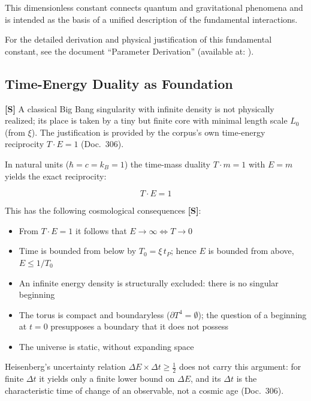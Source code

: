 This dimensionless constant connects quantum and gravitational phenomena and is intended as the basis of a unified description of the fundamental interactions.

\begin{tcolorbox}[colback=yellow!10!white,colframe=yellow!50!black,title=Note on Derivation]
	For the detailed derivation and physical justification of this fundamental constant, see the document ``Parameter Derivation'' (available at: ).
\end{tcolorbox}
	
	\subsection{Time-Energy Duality as Foundation}
	
	\begin{revolutionary}[Thesis]
		\textbf{[S]} A classical Big Bang singularity with infinite density is not physically realized; its place is taken by a tiny but finite core with minimal length scale $L_0$ (from $\xi$). The justification is provided by the corpus's own time-energy reciprocity $T\cdot E = 1$ (Doc.~306).
	\end{revolutionary}
	
	In natural units ($\hbar = c = k_B = 1$) the time-mass duality $T \cdot m = 1$ with $E = m$ yields the exact reciprocity:
	
	\begin{equation}
		T \cdot E = 1
	\end{equation}
	
	This has the following cosmological consequences \textbf{[S]}:
	\begin{itemize}
		\item From $T \cdot E = 1$ it follows that $E \to \infty \Leftrightarrow T \to 0$
		\item Time is bounded from below by $T_0 = \xi\,t_P$; hence $E$ is bounded from above, $E \le 1/T_0$
		\item An infinite energy density is structurally excluded: there is no singular beginning
		\item The torus is compact and boundaryless ($\partial T^4 = \emptyset$); the question of a beginning at $t = 0$ presupposes a boundary that it does not possess
		\item The universe is static, without expanding space
	\end{itemize}
	
	Heisenberg's uncertainty relation $\Delta E \times \Delta t \geq \frac{1}{2}$ does not carry this argument: for finite $\Delta t$ it yields only a finite lower bound on $\Delta E$, and its $\Delta t$ is the characteristic time of change of an observable, not a cosmic age (Doc.~306).

